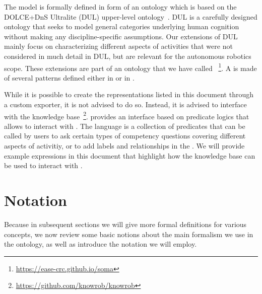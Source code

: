 The \neem model is formally defined in form of an \owl ontology which is based on the DOLCE+DnS Ultralite (DUL) upper-level ontology~\cite{DOLCE2003}.
DUL is a carefully designed ontology that seeks to model general categories underlying human cognition without making any discipline-specific assumptions.
Our extensions of DUL mainly focus on characterizing different aspects of activities that were not considered in much detail in DUL, but are relevant for the autonomous robotics scope.
These extensions are part of an ontology that we have called
\soma~\footnote{\url{https://ease-crc.github.io/soma}}.
A \neem is made of several patterns defined either in \dul or in \soma.

While it is possible to create the representations listed in this document through a custom exporter, it is not advised to do so.
Instead, it is advised to interface with the
\knowrob knowledge base~\footnote{\url{https://github.com/knowrob/knowrob}}.
\knowrob provides an interface based on predicate logics that allows to interact with \neems.
The language is a collection of predicates that can be called by users to ask certain types of competency questions covering different aspects of activitiy, or to add labels and relationships in the \neemnar.
We will provide example expressions in this document that highlight how the knowledge base can be used to interact with \neems.

\lipsum[4]

\section{Notation} %
\label{sec:notation}

Because in subsequent sections we will give more formal definitions for various concepts, we now review some basic notions about the main formalism we use in the ontology, as well as introduce the notation we will employ.

